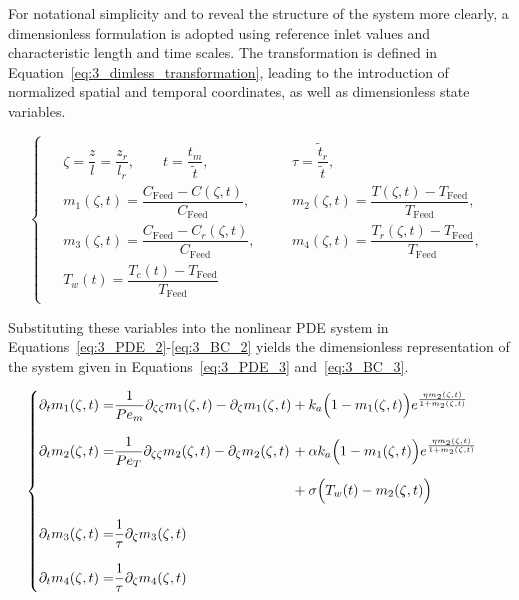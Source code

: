 For notational simplicity and to reveal the structure of the system more clearly, a dimensionless formulation is adopted using reference inlet values and characteristic length and time scales. The transformation is defined in Equation~\eqref{eq:3_dimless_transformation}, leading to the introduction of normalized spatial and temporal coordinates, as well as dimensionless state variables. 

\begin{equation} \label{eq:3_dimless_transformation}
\begin{cases}
    \begin{alignedat}{2}
        &\zeta = \dfrac{z}{l} = \dfrac{z_r}{l_r}, \qquad 
        t = \dfrac{t_m}{\tilde{t}}, \qquad
        &&\tau = \dfrac{\tilde{t}_r}{\tilde{t}}, \\[2.0ex]
        &m_1(\zeta, t) = \dfrac{C_{\text{Feed}} - C(\zeta, t)}{C_{\text{Feed}}}, \quad 
        &&m_2(\zeta, t) = \dfrac{T(\zeta, t) - T_{\text{Feed}}}{T_{\text{Feed}}}, \\[1.5ex]
        &m_3(\zeta, t) = \dfrac{C_{\text{Feed}} - C_r(\zeta, t)}{C_{\text{Feed}}}, \quad 
        &&m_4(\zeta, t) = \dfrac{T_r(\zeta, t) - T_{\text{Feed}}}{T_{\text{Feed}}}, \\[1.5ex]
        &T_w(t) = \dfrac{T_c(t) - T_{\text{Feed}}}{T_{\text{Feed}}}
    \end{alignedat}
\end{cases}
\end{equation}

Substituting these variables into the nonlinear PDE system in Equations~\eqref{eq:3_PDE_2}-\eqref{eq:3_BC_2} yields the dimensionless representation of the system given in Equations~\eqref{eq:3_PDE_3} and~\eqref{eq:3_BC_3}. 


\begin{equation} \label{eq:3_PDE_3}
\begin{cases}
\begin{alignedat}{2}
    \partial_{t} m_1(\zeta, t) = &\dfrac{1}{Pe_m} \partial_{\zeta\zeta} m_1(\zeta, t) 
    -\partial_{\zeta} m_1(\zeta, t) 
    &&+ k_a \Bigl( 1 - m_1(\zeta, t) \Bigr) e^{\frac{\eta m_2(\zeta, t)}{1 + m_2(\zeta, t)}} \\[2.0ex]

    \partial_{t} m_2(\zeta, t) = &\dfrac{1}{Pe_T} \partial_{\zeta\zeta} m_2(\zeta, t) 
    -\partial_{\zeta} m_2(\zeta, t)
    &&+ \alpha k_a \Bigl( 1 - m_1(\zeta, t) \Bigr) e^{\frac{\eta m_2(\zeta, t)}{1 + m_2(\zeta, t)}} \\[1.2ex]
    &&&+ \sigma \Bigl( T_w(t) - m_2(\zeta, t)\Bigr) \\[2.0ex]

    \partial_{t} m_3(\zeta, t) = &\frac{1}{\tau} \partial_{\zeta} m_3(\zeta, t) \\[2.0ex]

    \partial_{t} m_4(\zeta, t) = &\frac{1}{\tau} \partial_{\zeta} m_4(\zeta, t)
\end{alignedat}
\end{cases}
\end{equation}

